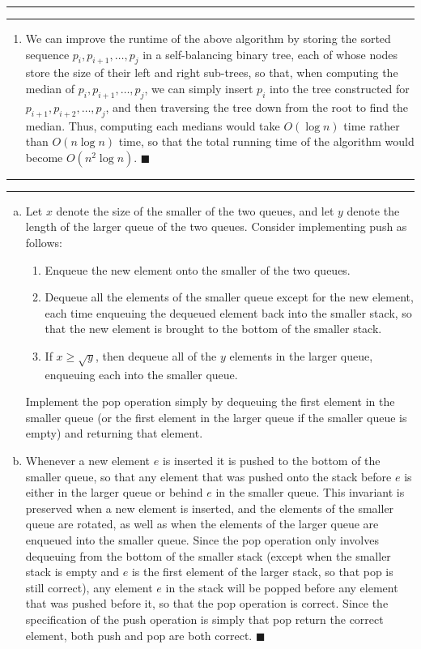 \documentclass[11pt]{article}
\newcounter{questionCounter}
\newcounter{partCounter}[questionCounter]
\newenvironment{question}[2][\arabic{questionCounter}]{%
    \setcounter{partCounter}{0}%
    \vspace{.25in} \hrule \vspace{0.5em}%
        \noindent{\bf #2}%
    \vspace{0.8em} \hrule \vspace{.10in}%
    \addtocounter{questionCounter}{1}%
}{}
\begin{document}
\begin{question}{Fitting with $L_1$ Fidelity}
\begin{enumerate}
\item We can improve the runtime of the above algorithm by storing the sorted
sequence $p_i,p_{i + 1},\ldots,p_j$ in a self-balancing binary tree, each of
whose nodes store the size of their left and right sub-trees, so that, when
computing the median of $p_i,p_{i + 1},\ldots,p_{j}$, we can simply insert
$p_i$ into the tree constructed for $p_{i + 1},p_{i + 2},\ldots, p_j$,
and then traversing the tree down from the root to find the median. Thus,
computing each medians would take $O(\log n)$ time rather than $O(n\log n)$
time, so that the total running time of the algorithm would become
$O(n^2 \log n)$. \qquad $\blacksquare$
\end{enumerate}
\end{question}

\begin{question}{Stacks n' Queues}
\begin{enumerate}[(a)]
\item Let $x$ denote the size of the smaller of the two queues, and let $y$
denote the length of the larger queue of the two queues. Consider implementing
push as follows:
\begin{enumerate}[1.]
\item Enqueue the new element onto the smaller of the two queues.
\item Dequeue all the elements of the smaller queue except for the new
element, each time enqueuing the dequeued element back into the smaller stack,
so that the new element is brought to the bottom of the smaller stack.
\item If $x \geq \sqrt{y}$, then dequeue all of the $y$ elements in the larger
queue, enqueuing each into the smaller queue.
\end{enumerate}
Implement the pop operation simply by dequeuing the first element in the
smaller queue (or the first element in the larger queue if the smaller queue
is empty) and returning that element.
\item Whenever a new element $e$ is inserted it is pushed to the bottom of the
smaller queue, so that any element that was pushed onto the stack before $e$
is either in the larger queue or behind $e$ in the smaller queue. This
invariant is preserved when a new element is inserted, and the elements of the
smaller queue are rotated, as well as when the elements of the larger queue
are enqueued into the smaller queue. Since the pop operation only involves
dequeuing from the bottom of the smaller stack (except when the smaller stack
is empty and $e$ is the first element of the larger stack, so that pop is
still correct), any element $e$ in the stack will be popped before any element
that was pushed before it, so that the pop operation is correct. Since the
specification of the push operation is simply that pop return the correct
element, both push and pop are both correct. \qquad $\blacksquare$


\end{enumerate}
\end{question}
\end{document}
